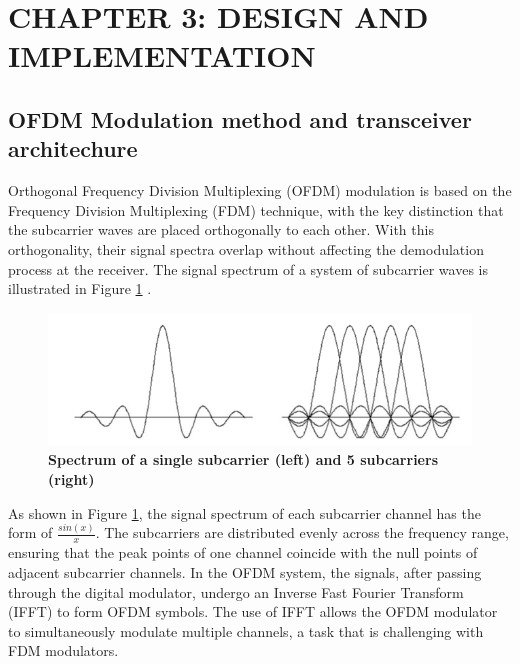 \section*{CHAPTER 3:  DESIGN AND IMPLEMENTATION}
\setcounter{section}{3}
\setcounter{subsection}{0}
\setcounter{figure}{0}
\setcounter{table}{0}

\subsection{OFDM Modulation method and transceiver architechure}
Orthogonal Frequency Division Multiplexing (OFDM) modulation is based on the Frequency Division Multiplexing (FDM) technique, with the key distinction that the subcarrier waves are placed orthogonally to each other. With this orthogonality, their signal spectra overlap without affecting the demodulation process at the receiver. The signal spectrum of a system of subcarrier waves is illustrated in Figure \ref{Spectrum} \cite{b6}.

\begin{figure}[htbp]
    \centering
    \includegraphics[width=\textwidth]{Figures/Spectrum.png}
    \caption{\bfseries\centering\fontsize{13pt}{0pt}\selectfont Spectrum of a single subcarrier (left) and 5 subcarriers (right)}
    \label{Spectrum}    
\end{figure}

As shown in Figure \ref{Spectrum}, the signal spectrum of each subcarrier channel has the form of $\frac{sin(x)}{x}$. The subcarriers are distributed evenly across the frequency range, ensuring that the peak points of one channel coincide with the null points of adjacent subcarrier channels. In the OFDM system, the signals, after passing through the digital modulator, undergo an Inverse Fast Fourier Transform (IFFT) to form OFDM symbols. The use of IFFT allows the OFDM modulator to simultaneously modulate multiple channels, a task that is challenging with FDM modulators.

